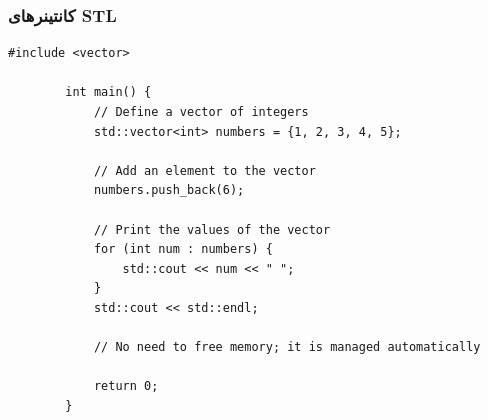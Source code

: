 \documentclass[12pt, a4paper]{report}
\begin{document}
\subsubsection{کانتینرهای STL}
\begin{LTR} %
	\begin{lstlisting}[breaklines=true]
		#include <vector>
		
		int main() {
			// Define a vector of integers
			std::vector<int> numbers = {1, 2, 3, 4, 5};
			
			// Add an element to the vector
			numbers.push_back(6);
			
			// Print the values of the vector
			for (int num : numbers) {
				std::cout << num << " ";
			}
			std::cout << std::endl;
			
			// No need to free memory; it is managed automatically
			
			return 0;
		}
	\end{lstlisting}
\end{LTR}
\end{document}
